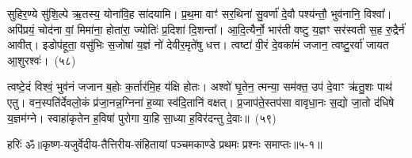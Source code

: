 सुहिर॒ण्ये सु॑शि॒ल्पे ऋ॒तस्य॒ योना॑वि॒ह सा॑दयामि। प्र॒थ॒मा वाꣳ॑ सर॒थिना॑ सु॒वर्णा॑ दे॒वौ पश्य॑न्तौ॒ भुव॑नानि॒ विश्वा᳚। अपि॑प्रयं॒ चोद॑ना वां॒ मिमा॑ना॒ होता॑रा॒ ज्योतिः॑ प्र॒दिशा॑ दि॒शन्ता᳚। आ॒दि॒त्यैर्नो॒ भार॑ती वष्टु य॒ज्ञꣳ सर॑स्वती स॒ह रु॒द्रैर्न॑ आवीत्। इडोप॑हूता॒ वसु॑भिः स॒जोषा॑ य॒ज्ञं नो॑ देवीर॒मृते॑षु धत्त। त्वष्टा॑ वी॒रं दे॒वका॑मं जजान॒ त्वष्टु॒रर्वा॑ जायत आ॒शुरश्वः॑।~(५८)\ip

त्वष्टे॒दं विश्वं॒ भुव॑नं जजान ब॒होः क॒र्तार॑मि॒ह य॑क्षि होतः। अश्वो॑ घृ॒तेन॒ त्मन्या॒ सम॑क्त॒ उप॑ दे॒वाꣳ ऋ॑तु॒शः पाथ॑ एतु। वन॒स्पति॑र्देवलो॒कं प्र॑जा॒नन्न॒ग्निना॑ ह॒व्या स्व॑दि॒तानि॑ वक्षत्। प्र॒जा\-प॑ते॒स्तप॑सा वावृधा॒नः स॒द्यो जा॒तो द॑धिषे य॒ज्ञम॑ग्ने। स्वाहा॑कृतेन ह॒विषा॑ पुरोगा या॒हि सा॒ध्या ह॒विर॑दन्तु दे॒वाः॥~(५९)\ip

{\anuvakamend[{अ॒ग्निष्ट्वा॑ वा॒मश्वो॒ द्विच॑त्वारिꣳशच्च}]}%

{हरिः॑ ॐ}{॥कृष्ण-यजुर्वेदीय-तैत्तिरीय-संहितायां पञ्चमकाण्डे प्रथमः प्रश्नः समाप्तः॥५-१॥}


